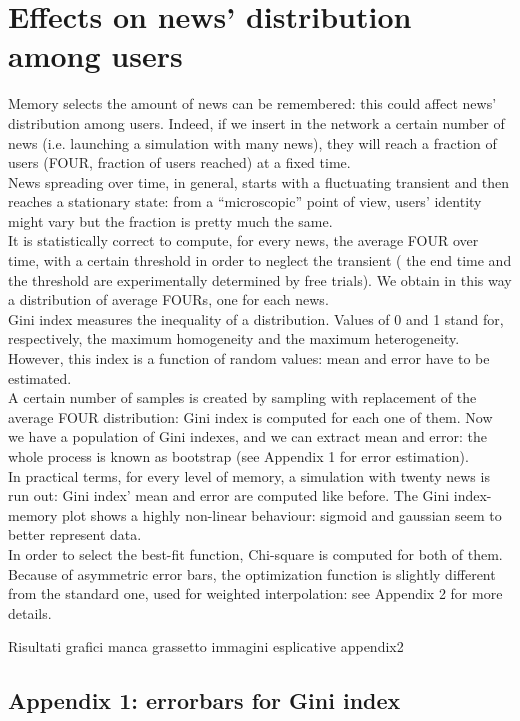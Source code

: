 \section{Effects on news' distribution among users}
Memory selects the amount of news can be remembered: this could affect news' distribution among users.
Indeed, if we insert in the network a certain number of news (i.e. launching a simulation with many news), they will reach a fraction of users (FOUR, fraction of users reached) at a fixed time.\\
News spreading over time, in general, starts with a fluctuating transient and then reaches a stationary state: from a ``microscopic'' point of view, users' identity might vary but the fraction is pretty much the same. \\
It is statistically correct to compute, for every news, the average FOUR over time, with a certain threshold in order to neglect the transient ( the end time and the threshold are experimentally determined by free trials).
We obtain in this  way a distribution of average FOURs, one for each news.\\
Gini index measures the inequality of a distribution. Values of 0 and 1 stand for, respectively, the maximum homogeneity and the maximum heterogeneity.
However, this index is a function of random values: mean and error have to be estimated.\\
A certain number of samples is created by sampling with replacement of the average FOUR distribution: Gini index is computed for each one of them.
Now we have a population of Gini indexes, and we can extract mean and error: the whole process is known as bootstrap (see Appendix 1 for error estimation).\\
In practical terms, for every level of  memory, a simulation with twenty news is run out: Gini index' mean and error are computed like before.
The Gini index-memory plot shows a highly non-linear behaviour: sigmoid and gaussian seem to better represent data.\\
 In order to select the best-fit function, Chi-square is computed for both of them. \\
Because of asymmetric error bars, the optimization function is slightly different from the standard one, used for weighted interpolation: see Appendix 2 for more details.

Risultati
grafici
manca grassetto
immagini esplicative appendix2


\subsection{Appendix 1: errorbars for Gini index}

